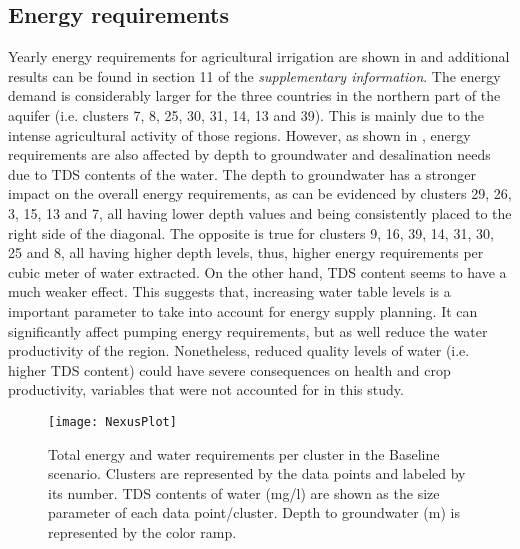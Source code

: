 \subsection{Energy requirements}
Yearly energy requirements for agricultural irrigation are shown in  and additional results can be found in section 11 of the \textit{supplementary information}. The energy demand is considerably larger for the three countries in the northern part of the aquifer (i.e. clusters 7,  8, 25, 30, 31, 14, 13 and 39). This is mainly due to the intense agricultural activity of those regions. However, as shown in , energy requirements are also affected by depth to groundwater and desalination needs due to TDS contents of the water. The depth to groundwater has a stronger impact on the overall energy requirements, as can be evidenced by clusters 29, 26, 3, 15, 13 and 7, all having lower depth values and being consistently placed to the right side of the diagonal. The opposite is true for clusters 9, 16, 39, 14, 31, 30, 25 and 8, all having higher depth levels, thus, higher energy requirements per cubic meter of water extracted. On the other hand, TDS content seems to have a much weaker effect. This suggests that, increasing water table levels is a important parameter to take into account for energy supply planning. It can significantly affect pumping energy requirements, but as well reduce the water productivity of the region. Nonetheless, reduced quality levels of water (i.e. higher TDS content) could have severe consequences on health and crop productivity, variables that were not accounted for in this study.

\begin{figure*}[!b]
	\centering
	\texttt{[image: NexusPlot]}
	\caption{Total energy and water requirements per cluster in the Baseline scenario. Clusters are represented by the data points and labeled by its number. TDS contents of water (mg/l) are shown as the size parameter of each data point/cluster. Depth to groundwater (m) is represented by the color ramp.}
	\label{fig:energyclusters}
\end{figure*}


